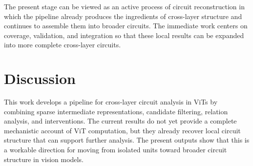 \documentclass{ccn}
\begin{document}
The present stage can be viewed as an active process of circuit reconstruction in which the pipeline already produces the ingredients of cross-layer structure and continues to assemble them into broader circuits. The immediate work centers on coverage, validation, and integration so that these local results can be expanded into more complete cross-layer circuits.

\section{Discussion}

This work develops a pipeline for cross-layer circuit analysis in ViTs by combining sparse intermediate representations, candidate filtering, relation analysis, and interventions. The current results do not yet provide a complete mechanistic account of ViT computation, but they already recover local circuit structure that can support further analysis. The present outputs show that this is a workable direction for moving from isolated units toward broader circuit structure in vision models.

\printbibliography
\end{document}

